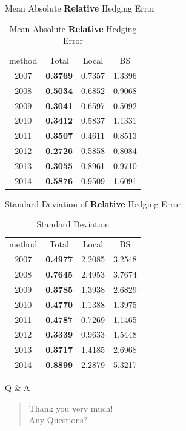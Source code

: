 \documentclass[10pt,table,mathserif]{beamer}
\begin{document}
\begin{frame}{Mean Absolute \textbf{Relative} Hedging Error}
\begin{table}[htp!]
	\centering
	
	\begin{tabular}{|c|c|c|c|}
		\hline
		method &Total&Local&BS \\
		2007&\textbf{0.3769}&0.7357&1.3396\\
		2008&\textbf{0.5034}&0.6852&0.9068\\
		2009&\textbf{0.3041}&0.6597&0.5092\\
		2010&\textbf{0.3412}&0.5837&1.1331\\
		2011&\textbf{0.3507}&0.4611&0.8513\\
		2012&\textbf{0.2726}&0.5858&0.8084\\
		2013&\textbf{0.3055}&0.8961&0.9710\\
		2014&\textbf{0.5876}&0.9509&1.6091\\
		\hline
	\end{tabular}
	\caption{Mean Absolute \textbf{Relative} Hedging Error}
\end{table}

\end{frame}

\begin{frame}{Standard Deviation of \textbf{Relative} Hedging Error}
\begin{table}[htp!]
	\centering
	
	\begin{tabular}{|c|c|c|c|}
		\hline
		method &Total&Local&BS \\
		2007&\textbf{0.4977}&2.2085&3.2548\\
		2008&\textbf{0.7645}&2.4953&3.7674\\
		2009&\textbf{0.3785}&1.3938&2.6829\\
		2010&\textbf{0.4770}&1.1388&1.3975\\
		2011&\textbf{0.4787}&0.7269&1.1465\\
		2012&\textbf{0.3339}&0.9633&1.5448\\
		2013&\textbf{0.3717}&1.4185&2.6968\\
		2014&\textbf{0.8899}&2.2879&5.3217\\
		\hline
	\end{tabular}
	\caption{Standard Deviation}
\end{table}
\end{frame}
\begin{frame}{Q \& A}
\LARGE
\begin{quote}
	\alert{Thank you very much!}\\
	\hspace{8ex} Any Questions?
\end{quote}
\end{frame}
\end{document}
